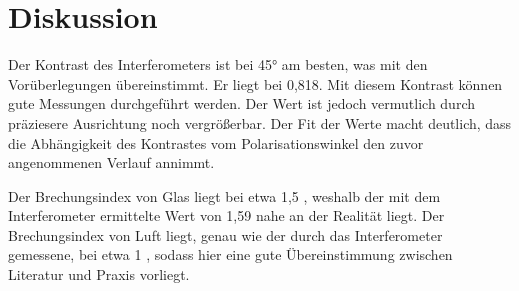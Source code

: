 \section{Diskussion}
\label{sec:Diskussion}


            Der Kontrast des Interferometers ist bei 45° am besten, was mit den Vorüberlegungen übereinstimmt.
            Er liegt bei 0,818. Mit diesem Kontrast können gute Messungen durchgeführt werden. Der Wert ist jedoch
            vermutlich durch präziesere Ausrichtung noch vergrößerbar. Der Fit der Werte macht deutlich, 
            dass die Abhängigkeit des Kontrastes vom Polarisationswinkel den zuvor angenommenen Verlauf annimmt.

            Der Brechungsindex von Glas liegt bei etwa 1,5 \cite{rii}, weshalb der mit dem Interferometer ermittelte 
            Wert von 1,59 nahe an der Realität liegt. Der Brechungsindex von Luft liegt, genau wie der 
            durch das Interferometer gemessene, bei etwa 1 \cite{refr_index_air}, sodass hier eine gute Übereinstimmung
            zwischen Literatur und Praxis vorliegt. 
